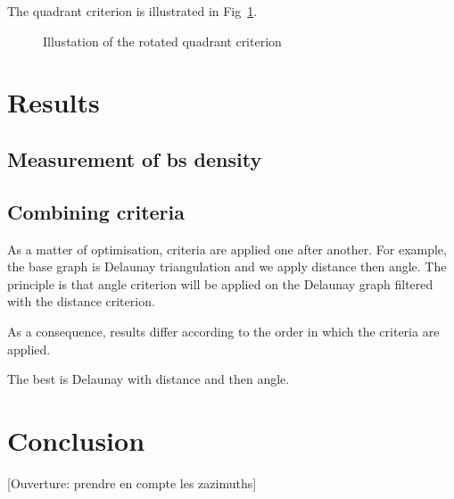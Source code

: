 \documentclass[lettersize,journal,english]{IEEEtran}
\begin{document}
The quadrant criterion is illustrated in Fig~\ref{fig:crit_qua}.
\begin{figure}
    \centering
    \caption{Illustation of the rotated quadrant criterion}
    \label{fig:crit_qua}
\end{figure}

\section{Results}

\subsection{Measurement of \acrshort{bs} density}

\subsection{Combining criteria}
As a matter of optimisation, criteria are applied one after another. For example, the base graph is Delaunay triangulation and we apply distance then angle.
The principle is that angle criterion will be applied on the Delaunay graph filtered with the distance criterion.

As a consequence, results differ according to the order in which the criteria are applied.

The best is Delaunay with distance and then angle.



\section{Conclusion}

[Ouverture: prendre en compte les zazimuths]

\printglossary[type=\acronymtype]
\printglossary



\end{document}
